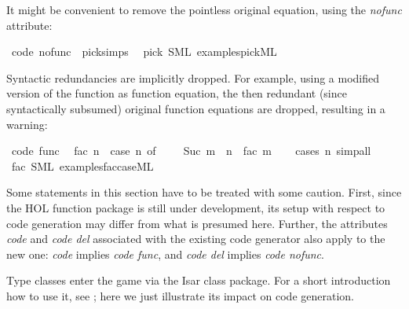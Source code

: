 \begin{isabellebody}
\begin{isamarkuptext}

  It might be convenient to remove the pointless original
  equation, using the \emph{nofunc} attribute:%
\end{isamarkuptext}%
\isamarkuptrue%
\isamarkupfalse%
\ {\isacharbrackleft}code\ nofunc{\isacharbrackright}\ {\isacharequal}\ pick{\isachardot}simps\ \isanewline
\isanewline
{}\isamarkupfalse%
\ pick\ {\isacharparenleft}SML\ {\isachardoublequoteopen}examples{\isacharslash}pick{}{\isachardot}ML{\isachardoublequoteclose}{\isacharparenright}%
\begin{isamarkuptext}%

  Syntactic redundancies are implicitly dropped. For example,
  using a modified version of the  function
  as function equation, the then redundant (since
  syntactically subsumed) original function equations
  are dropped, resulting in a warning:%
\end{isamarkuptext}%
\isamarkuptrue%
\isamarkupfalse%
\ {\isacharbrackleft}code\ func{\isacharbrackright}{\isacharcolon}\isanewline
\ \ {\isachardoublequoteopen}fac\ n\ {\isacharequal}\ {\isacharparenleft}case\ n\ of\ {}\ {\isasymRightarrow}\ {}\ {\isacharbar}\ Suc\ m\ {\isasymRightarrow}\ n\ {\isacharasterisk}\ fac\ m{\isacharparenright}{\isachardoublequoteclose}\isanewline
%
\isadelimproof
\ \ %
\endisadelimproof
%
\isatagproof
{}\isamarkupfalse%
\ {\isacharparenleft}cases\ n{\isacharparenright}\ simp{\isacharunderscore}all%
\endisatagproof
{\isafoldproof}%
%
\isadelimproof
\isanewline
%
\endisadelimproof
\isanewline
{}\isamarkupfalse%
\ fac\ {\isacharparenleft}SML\ {\isachardoublequoteopen}examples{\isacharslash}fac{\isacharunderscore}case{\isachardot}ML{\isachardoublequoteclose}{\isacharparenright}%
\begin{isamarkuptext}%

  \begin{warn}
    Some statements in this section have to be treated with some
    caution. First, since the HOL function package is still
    under development, its setup with respect to code generation
    may differ from what is presumed here.
    Further, the attributes \emph{code} and \emph{code del}
    associated with the existing code generator also apply to
    the new one: \emph{code} implies \emph{code func},
    and \emph{code del} implies \emph{code nofunc}.
  \end{warn}%
\end{isamarkuptext}%
\isamarkuptrue%
%
\isamarkuptrue%
%
\begin{isamarkuptext}%
Type classes enter the game via the Isar class package.
  For a short introduction how to use it, see \cite{isabelle-classes};
  here we just illustrate its impact on code generation.


\end{isamarkuptext}
\end{isabellebody}
